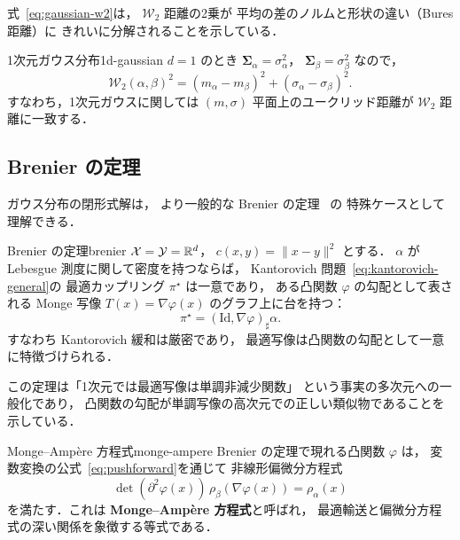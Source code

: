 式~\eqref{eq:gaussian-w2}は，
$\mathcal{W}_2$ 距離の2乗が
平均の差のノルムと形状の違い（Bures 距離）に
きれいに分解されることを示している．

\begin{example}{1次元ガウス分布}{1d-gaussian}
$d=1$ のとき $\boldsymbol{\Sigma}_\alpha = \sigma_\alpha^2$，
$\boldsymbol{\Sigma}_\beta = \sigma_\beta^2$ なので，
\[
  \mathcal{W}_2(\alpha, \beta)^2
  = (m_\alpha - m_\beta)^2 + (\sigma_\alpha - \sigma_\beta)^2.
\]
すなわち，1次元ガウスに関しては
$(m, \sigma)$ 平面上のユークリッド距離が
$\mathcal{W}_2$ 距離に一致する．
\end{example}

\subsection{Brenier の定理}\label{subsec:brenier}

ガウス分布の閉形式解は，
より一般的な Brenier の定理~\cite{Brenier1991} の
特殊ケースとして理解できる．

\begin{theorem}{Brenier の定理}{brenier}
$\mathcal{X} = \mathcal{Y} = \mathbb{R}^d$，
$c(x, y) = \|x - y\|^2$ とする．
$\alpha$ が Lebesgue 測度に関して密度を持つならば，
Kantorovich 問題~\eqref{eq:kantorovich-general}の
最適カップリング $\pi^\star$ は一意であり，
ある凸関数 $\varphi$ の勾配として表される
Monge 写像 $T(x) = \nabla \varphi(x)$ のグラフ上に台を持つ：
\[
  \pi^\star = (\mathrm{Id}, \nabla \varphi)_\sharp \alpha.
\]
すなわち Kantorovich 緩和は厳密であり，
最適写像は凸関数の勾配として一意に特徴づけられる．
\end{theorem}

この定理は「1次元では最適写像は単調非減少関数」
という事実の多次元への一般化であり，
凸関数の勾配が単調写像の高次元での正しい類似物であることを示している．

\begin{remark}{Monge--Amp\`ere 方程式}{monge-ampere}
Brenier の定理で現れる凸関数 $\varphi$ は，
変数変換の公式~\eqref{eq:pushforward}を通じて
非線形偏微分方程式
\[
  \det(\partial^2 \varphi(x))\, \rho_\beta(\nabla \varphi(x))
  = \rho_\alpha(x)
\]
を満たす．これは \textbf{Monge--Amp\`ere 方程式}と呼ばれ，
最適輸送と偏微分方程式の深い関係を象徴する等式である．
\end{remark}
